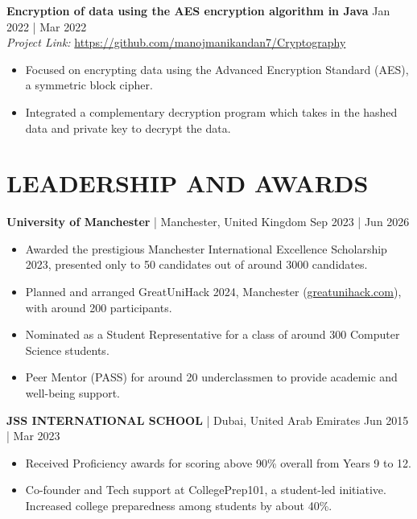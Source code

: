 \documentclass[a4paper,1.5pt]{extarticle}
\begin{document}
\noindent
\textbf{Encryption of data using the AES encryption algorithm in Java} \hfill Jan 2022 | Mar 2022 \\ %
\textit{Project Link:} \url{https://github.com/manojmanikandan7/Cryptography}  %
\begin{itemize}
    \item Focused on encrypting data using the Advanced Encryption Standard (AES), a symmetric block cipher. 
    \item Integrated a complementary decryption program which takes in the hashed data and private key to decrypt the data.
\end{itemize}

\section*{LEADERSHIP AND AWARDS}
\noindent
\textbf{University of Manchester} | Manchester, United Kingdom \hfill Sep 2023 | Jun 2026 %
\begin{itemize}
    \item Awarded the prestigious Manchester International Excellence Scholarship 2023, presented only to 50 candidates out of around 3000 candidates.
    \item Planned and arranged GreatUniHack 2024, Manchester (\href{https://www.greatunihack.com}{greatunihack.com}), with around 200 participants.
    \item Nominated as a Student Representative for a class of around 300 Computer Science students.
    \item Peer Mentor (PASS) for around 20 underclassmen to provide academic and well-being support.
\end{itemize}

\noindent
\textbf{JSS INTERNATIONAL SCHOOL} | Dubai, United Arab Emirates \hfill Jun 2015 | Mar 2023
\begin{itemize}
    \item Received Proficiency awards for scoring above 90\% overall from Years 9 to 12.
    \item Co-founder and Tech support at CollegePrep101, a student-led initiative. Increased college preparedness among students by about 40\%.
\end{itemize}
\end{document}
